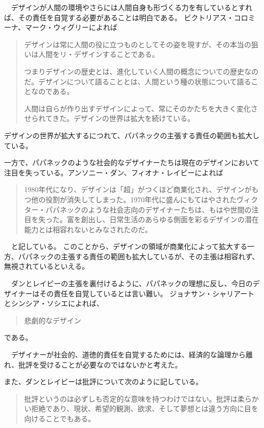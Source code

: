 \documentclass{jsarticle}
\begin{document}
　デザインが人間の環境やさらには人間自身も形づくる力を有しているとすれば、その責任を自覚する必要があることは明白である。
ビクトリアス・コロミーナ、マーク・ウィグリーによれば
\begin{quotation}
  デザインは常に人間の役に立つものとしてその姿を現すが、その本当の狙いは人間をリ・デザインすることである。

  つまりデザインの歴史とは、進化していく人間の概念についての歴史なのだ。デザインについて語ることとは、人間という種の状態について語ることなのである。

  人間は自らが作り出すデザインによって、常にそのかたちを大きく変化させられてきた。デザインの世界は拡大を続けている。
\end{quotation}
デザインの世界が拡大するにつれて、パパネックの主張する責任の範囲も拡大している。

一方で、パパネックのような社会的なデザイナーたちは現在のデザインにおいて注目を失っている。アンソニー・ダン、フィオナ・レイビーによれば\cite{Speculative}
\begin{quotation}
  1980年代になり、デザインは「超」がつくほど商業化され、デザインがもつ他の役割が消失してしまった。1970年代に盛んにもてはやされたヴィクター・パパネックのような社会志向のデザイナーたちは、もはや世間の注目を失った。富を創出し、日常生活のあらゆる側面を彩るデザインの潜在能力とは相容れないとみなされたのだ。
\end{quotation}
　と記している。
このことから、デザインの領域が商業化によって拡大する一方、パパネックの主張する責任の範囲も拡大しているが、その主張は相容れず、無視されているといえる。


　ダンとレイビーの主張を裏付けるように、パパネックの理想に反し、今日のデザイナーはその責任を自覚しているとは言い難い。
ジョナサン・シャリアートとシンシア・ソシエ\cite{tragetic}によれば、
\begin{quotation}
  悲劇的なデザイン
\end{quotation}

である。

　デザイナーが社会的、道徳的責任を自覚するためには、経済的な論理から離れ、批評を受けることが必要なのではないかと考えた。

また、ダンとレイビーは批評について次のように記している。
\begin{quotation}
批評というのは必ずしも否定的な意味を持つわけではない。批評は柔らかい拒絶であり、現状、希望的観測、欲求、そして夢想とは違う方向に目を向けることでもある。
\end{quotation}
\end{document}
